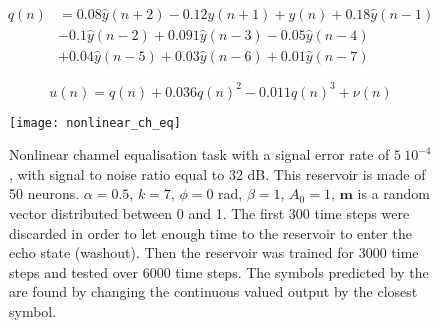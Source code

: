 \begin{align}
	q(n) &= 0.08\hat{y}(n+2)-0.12\hat{y}(n+1)+\hat{y}(n)+0.18\hat{y}(n-1) \nonumber\\
	&-0.1\hat{y}(n-2)+0.091\hat{y}(n-3)-0.05\hat{y}(n-4) \nonumber\\
	&+0.04\hat{y}(n-5)+0.03\hat{y}(n-6)+0.01\hat{y}(n-7) \label{signal_mixing}
\end{align}

\begin{equation}
	u(n)=q(n)+0.036q(n)^2-0.011q(n)^3+\nu(n)
	\label{nonlinear_ch}
\end{equation}

\begin{figure}[h]
	\centering
	\texttt{[image: nonlinear\_ch\_eq]}
	\caption{Nonlinear channel equalisation task with a signal error rate of $5~10^{-4}$, with signal to noise ratio equal to 32 dB. This reservoir is made of 50 neurons. $\alpha=0.5$, $k=7$, $\phi=0$ rad, $\beta=1$, $A_0=1$, $\mathbf{m}$ is a random vector distributed between 0 and 1. The first 300 time steps were discarded in order to let enough time to the reservoir to enter the echo state (washout). Then the reservoir was trained for 3000 time steps and tested over 6000 time steps. The symbols predicted by the \rcer are found by changing the continuous valued output by the closest symbol.}
\end{figure}
